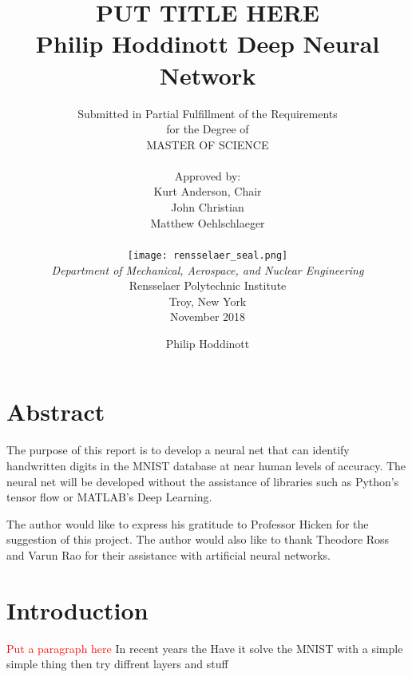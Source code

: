 \documentclass[12pt]{article}
\title{ 
		\LARGE \textbf{\uppercase{Put Title Here}} \\
		\vspace{0.25cm}
		\LARGE \textbf{Philip Hoddinott}
	}
\author{\small{Submitted in Partial Fulfillment of the Requirements} \\ \small{for the Degree of} \\
		\uppercase{Master of Science} \\ \\
		Approved by:
		\\ Kurt Anderson, Chair \\ John Christian \\ Matthew Oehlschlaeger \\ \\ %
		\texttt{[image: rensselaer\_seal.png]} \\
		\small{\textit{Department of Mechanical, Aerospace, and Nuclear Engineering}} \\
		\small{Rensselaer Polytechnic Institute} \\ 
		\small{Troy, New York} \\
		\small{November 2018}
	}
\begin{document}
	\clearpage
		\title{Deep Neural Network}
	\author{Philip Hoddinott}
	
	\maketitle


	


	
	



	
\tableofcontents
\listoffigures	
	\newpage
	\section*{Abstract}
	The purpose of this report is to develop a neural net that can identify handwritten digits in the MNIST database at near human levels of accuracy. The neural net will be developed without the assistance of libraries such as Python's tensor flow or MATLAB's Deep Learning.\par 
	The author would like to express his gratitude to Professor Hicken for the suggestion of this project. The author would also like to thank Theodore Ross and Varun Rao for their assistance with artificial neural networks.
	



	\section{Introduction}
	\textcolor{red}{Put a paragraph here}
	In recent years the 
	Have it solve the MNIST with a simple simple thing
	then try diffrent layers and stuff
	
\end{document}

